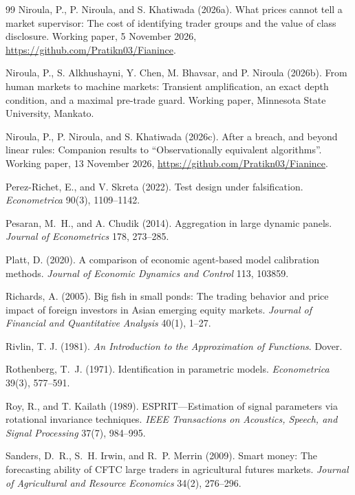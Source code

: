 \documentclass[12pt]{article}
\theoremstyle{definition}
\theoremstyle{remark}
\begin{document}
\begin{thebibliography}{99}
 Niroula, P., P. Niroula, and S. Khatiwada (2026a). What prices cannot tell a market supervisor: The cost of identifying trader groups and the value of class disclosure. Working paper, 5 November 2026, \url{https://github.com/Pratikn03/Fianince}.

 Niroula, P., S. Alkhushayni, Y. Chen, M. Bhavsar, and P. Niroula (2026b). From human markets to machine markets: Transient amplification, an exact depth condition, and a maximal pre-trade guard. Working paper, Minnesota State University, Mankato.

 Niroula, P., P. Niroula, and S. Khatiwada (2026c). After a breach, and beyond linear rules: Companion results to ``Observationally equivalent algorithms''. Working paper, 13 November 2026, \url{https://github.com/Pratikn03/Fianince}.

 Perez-Richet, E., and V. Skreta (2022). Test design under falsification. \emph{Econometrica} 90(3), 1109--1142.

 Pesaran, M.~H., and A. Chudik (2014). Aggregation in large dynamic panels. \emph{Journal of Econometrics} 178, 273--285.

 Platt, D. (2020). A comparison of economic agent-based model calibration methods. \emph{Journal of Economic Dynamics and Control} 113, 103859.

 Richards, A. (2005). Big fish in small ponds: The trading behavior and price impact of foreign investors in Asian emerging equity markets. \emph{Journal of Financial and Quantitative Analysis} 40(1), 1--27.

 Rivlin, T. J. (1981). \emph{An Introduction to the Approximation of Functions}. Dover.

 Rothenberg, T.~J. (1971). Identification in parametric models. \emph{Econometrica} 39(3), 577--591.

 Roy, R., and T. Kailath (1989). ESPRIT---Estimation of signal parameters via rotational invariance techniques. \emph{IEEE Transactions on Acoustics, Speech, and Signal Processing} 37(7), 984--995.

 Sanders, D.~R., S.~H. Irwin, and R.~P. Merrin (2009). Smart money: The forecasting ability of CFTC large traders in agricultural futures markets. \emph{Journal of Agricultural and Resource Economics} 34(2), 276--296.


\end{thebibliography}
\end{document}
